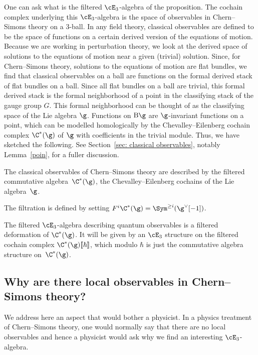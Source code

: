 \documentclass[10pt]{amsart}
\begin{document}
One can ask what is the filtered $\cE_3$-algebra of the proposition.  
The cochain complex underlying this $\cE_3$-algebra is the space of observables in Chern--Simons theory on a $3$-ball.  
In any field theory, classical observables are defined to be the space of functions on a certain derived version of the equations of motion. 
Because we are working in perturbation theory, we look at the derived space of solutions to the equations of motion near a given (trivial) solution. 
Since, for Chern--Simons theory, solutions to the equations of motion are flat bundles, 
we find that classical observables on a ball are functions on the formal derived stack of flat bundles on a ball.  
Since all flat bundles on a ball are trivial, this formal derived stack is the formal neighborhood of a point in the classifying stack of the gauge group $G$.  
This formal neighborhood can be thought of as the classifying space of the Lie algebra $\g$.  
Functions on ${\rm B}\g$ are $\g$-invariant functions on a point, 
which can be modelled homologically by the Chevalley--Eilenberg cochain complex $\C^*(\g)$ of $\g$ with coefficients in the trivial module. 
Thus, we have sketched the following. See Section~\ref{sec: classical observables}, notably Lemma~\ref{poin}, for a fuller discussion.

\begin{lmm*}
The classical observables of Chern--Simons theory are described by the filtered commutative algebra~$\C^*(\g)$, the Chevalley--Eilenberg cochains of the Lie algebra~$\g$.
\end{lmm*}

The filtration is defined by setting $F^i \C^*(\g) = \Sym^{\ge i} (\g^\vee[-1])$.

The filtered $\cE_3$-algebra describing quantum observables is a filtered deformation of $\C^*(\g)$. 
It will be given by an $\cE_3$ structure on the filtered cochain complex $\C^*(\g)[\![\hbar]\!]$, 
which modulo $\hbar$ is just the commutative algebra structure on~$\C^*(\g)$.  


\subsection{Why are there local observables in Chern--Simons theory?}

We address here an aspect that would bother a physicist.
In a physics treatment of Chern--Simons theory, one would normally say that there are no local observables and hence a physicist would ask why we find an interesting $\cE_3$-algebra.
\end{document}
